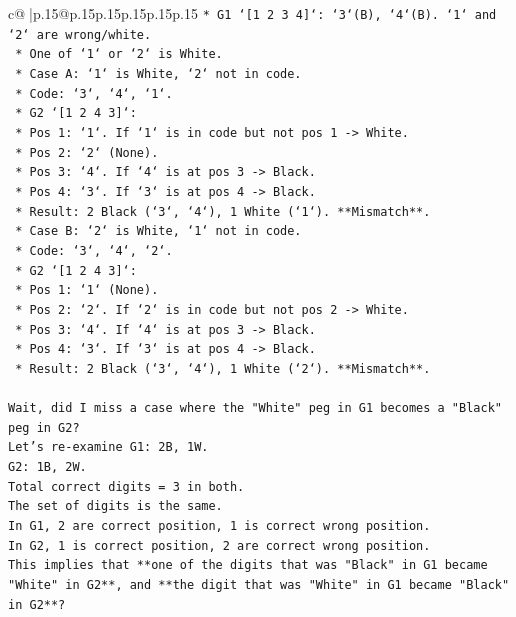 \documentclass{article}
\begin{document}
{\begin{supertabular}{c@{$\;$}|p{.15\linewidth}@{}p{.15\linewidth}p{.15\linewidth}p{.15\linewidth}p{.15\linewidth}p{.15\linewidth}}
{{{\texttt{*   G1 `{[}1 2 3 4{]}`: `3`(B), `4`(B). `1` and `2` are wrong/white.} \\
\texttt{    *   One of `1` or `2` is White.} \\
\texttt{    *   Case A: `1` is White, `2` not in code.} \\
\texttt{        *   Code: `3`, `4`, `1`.} \\
\texttt{        *   G2 `{[}1 2 4 3{]}`:} \\
\texttt{            *   Pos 1: `1`. If `1` is in code but not pos 1 {-}> White.} \\
\texttt{            *   Pos 2: `2` (None).} \\
\texttt{            *   Pos 3: `4`. If `4` is at pos 3 {-}> Black.} \\
\texttt{            *   Pos 4: `3`. If `3` is at pos 4 {-}> Black.} \\
\texttt{            *   Result: 2 Black (`3`, `4`), 1 White (`1`). **Mismatch**.} \\
\texttt{    *   Case B: `2` is White, `1` not in code.} \\
\texttt{        *   Code: `3`, `4`, `2`.} \\
\texttt{        *   G2 `{[}1 2 4 3{]}`:} \\
\texttt{            *   Pos 1: `1` (None).} \\
\texttt{            *   Pos 2: `2`. If `2` is in code but not pos 2 {-}> White.} \\
\texttt{            *   Pos 3: `4`. If `4` is at pos 3 {-}> Black.} \\
\texttt{            *   Pos 4: `3`. If `3` is at pos 4 {-}> Black.} \\
\texttt{            *   Result: 2 Black (`3`, `4`), 1 White (`2`). **Mismatch**.} \\
\\ 
\texttt{Wait, did I miss a case where the "White" peg in G1 becomes a "Black" peg in G2?} \\
\texttt{Let's re{-}examine G1: 2B, 1W.} \\
\texttt{G2: 1B, 2W.} \\
\texttt{Total correct digits = 3 in both.} \\
\texttt{The set of digits is the same.} \\
\texttt{In G1, 2 are correct position, 1 is correct wrong position.} \\
\texttt{In G2, 1 is correct position, 2 are correct wrong position.} \\
\texttt{This implies that **one of the digits that was "Black" in G1 became "White" in G2**, and **the digit that was "White" in G1 became "Black" in G2**?} \\
}}}
\end{supertabular}}
\end{document}
